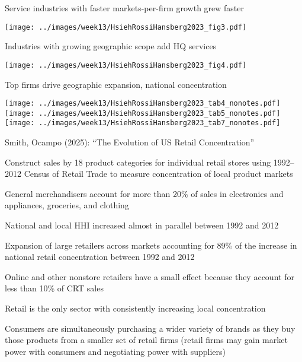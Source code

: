 \documentclass[11pt,notes=hide,aspectratio=169]{beamer}
\begin{document}
\begin{frame}{Service industries with faster markets-per-firm growth grew faster}
\begin{center}
\texttt{[image: ../images/week13/HsiehRossiHansberg2023\_fig3.pdf]}
\end{center}
\end{frame}
\begin{frame}{Industries with growing geographic scope add HQ services}
\begin{center}
\texttt{[image: ../images/week13/HsiehRossiHansberg2023\_fig4.pdf]}
\end{center}
\end{frame}
\begin{frame}{Top firms drive geographic expansion, national concentration}
\begin{center}
\texttt{[image: ../images/week13/HsiehRossiHansberg2023\_tab4\_nonotes.pdf]}
\texttt{[image: ../images/week13/HsiehRossiHansberg2023\_tab5\_nonotes.pdf]}
\texttt{[image: ../images/week13/HsiehRossiHansberg2023\_tab7\_nonotes.pdf]}
\end{center}
\end{frame}
\begin{frame}{Smith, Ocampo (2025): ``The Evolution of US Retail Concentration''}
\begin{itemize}{\small
\item Construct sales by 18 product categories for individual retail stores using 1992--2012 Census of Retail Trade to measure concentration of local product markets
\item General merchandisers account for more than 20\% of sales in electronics and appliances, groceries, and clothing
\item National and local HHI increased almost in parallel between 1992 and 2012
\item Expansion of large retailers across markets accounting for 89\% of the increase in national retail concentration between 1992 and 2012
\item Online and other nonstore retailers have a small effect because they account for less than 10\% of CRT sales 
\item Retail is the only sector with consistently increasing local concentration
\item Consumers are simultaneously purchasing a wider variety of brands as they buy those products from a smaller set of retail firms (retail firms may gain market power with consumers and negotiating power with suppliers)
}\end{itemize}
\end{frame}
\end{document}
